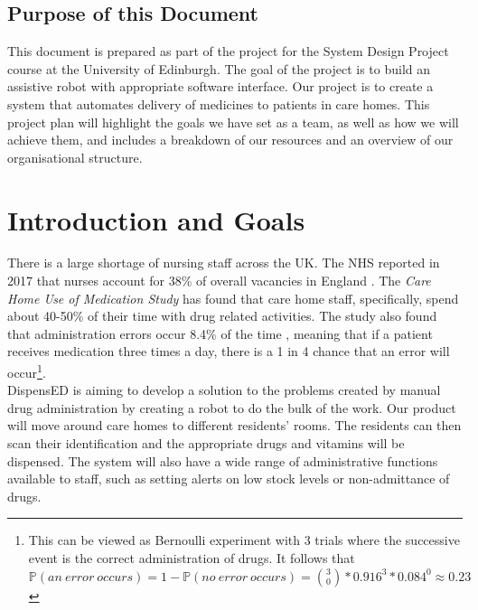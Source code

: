 \documentclass[a4paper,10pt,DIV10,openright,openbib]{scrreprt}
\begin{document}
\section*{Purpose of this Document}
This document is prepared as part of the project for the System Design Project course
at the University of Edinburgh. The goal of the project is to build an assistive robot with 
appropriate software interface. Our project is to create a system that automates delivery 
of medicines to patients in care homes. This project plan will highlight the goals we
have set as a team, as well as how we will achieve them, and includes a breakdown
of our resources and an overview of our organisational structure.
\vspace{2cm}
{\let\clearpage\relax  \chapter{Introduction and Goals}}

There is a large shortage of nursing staff across the UK. The NHS reported in 2017
that nurses account for 38\% of overall vacancies in England \cite{NHS}.
The \textit{Care Home Use of Medication Study} has found that care home staff, specifically, spend about 40-50\% of their time with drug
related activities. The study also found that administration errors occur
8.4\% of the time \cite{CHUMS}, meaning that if a patient receives medication
three times a day, there is a 1 in 4 chance that an error will
occur\footnote{This can be viewed as Bernoulli experiment with 3 trials where the successive
  event is the correct administration of drugs. It follows that
  $\mathbb{P}(an\ error\ occurs) = 1 - \mathbb{P}(no\ error\ occurs) =
  \binom{3}{0}*0.916^3*0.084^0 \approx 0.23$}. \\
DispensED is aiming to develop a solution to the problems created by manual drug
administration by creating a robot to do the bulk of the work. Our product will
move around care homes to different residents' rooms. The residents can then
scan their identification and the appropriate drugs and vitamins will be
dispensed. The system will also have a wide range of administrative functions
available to staff, such as setting alerts on low stock levels or non-admittance of drugs.
\end{document}
